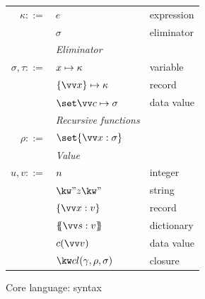 \begin{figure}
\begin{minipage}[t]{0.48\textwidth}
\begin{tabularx}{\textwidth}{rL{2.7cm}L{3cm}}
         $\kappa ::=$
         &
         $e$
         &
         expression
         \\
         &
         $\sigma$
         &
         eliminator
         \\[2mm]
         &\textit{Eliminator}&
         \\
         $\sigma, \tau ::=$
         &
         ${x}\mapsto{\kappa}$
         &
         variable
         \\
         &
         $\elimRecord{\seq{x}}{\kappa}$
         &
         record
         \\
         &
         $\elimConstr{\seq{\elimBind{c}{\sigma}}}$
         &
         data value
         \\[2mm]
         &\textit{Recursive functions}&
         \\
         $\rho ::=$
         &
         $\set{\seq{\bind{x}{\sigma}}}$
         &
         \\[2mm]
         &\textit{Value}&
         \\
         $u, v ::=$
         &
         $n$
         &
         integer
         \\
         &
         $\exStr{z}$
         &
         string
         \\
         &
         $\exRec{\seq{\bind{x}{v}}}$
         &
         record
         \\
         &
         $\exDict{\seq{\bind{s}{v}}}$
         &
         dictionary
         \\
         &
         $\exConstr{c}{\seq{v}}$
         &
         data value
         \\
         &
         $\exClosure{\gamma}{\rho}{\sigma}$
         &
         closure
         \\[0mm]
      \end{tabularx}
   \end{minipage}
\caption{Core language: syntax}
\end{figure}
